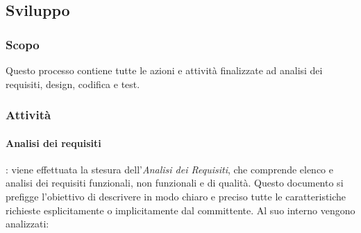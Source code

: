 \subsection{Sviluppo}
\subsubsection{Scopo} Questo processo contiene tutte le azioni e attività finalizzate ad analisi dei requisiti, design, codifica e test.
\subsubsection{Attività}

\paragraph{Analisi dei requisiti}: viene effettuata la stesura dell'\textit{Analisi dei Requisiti}, che comprende elenco e analisi dei requisiti funzionali, non funzionali e di qualità. Questo documento si prefigge l'obiettivo di descrivere in modo chiaro e preciso tutte le caratteristiche richieste esplicitamente o implicitamente dal committente.
    Al suo interno vengono analizzati:
